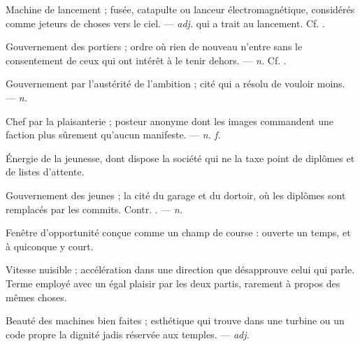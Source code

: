  Machine de lancement ; fusée, catapulte ou lanceur électromagnétique, considérés comme jeteurs de choses vers le ciel. ---  \textit{adj.} qui a trait au lancement. Cf. .

 Gouvernement des portiers ; ordre où rien de nouveau n'entre sans le consentement de ceux qui ont intérêt à le tenir dehors. ---  \textit{n.} Cf. .

 Gouvernement par l'austérité de l'ambition ; cité qui a résolu de vouloir moins. ---  \textit{n.}

 Chef par la plaisanterie ; posteur anonyme dont les images commandent une faction plus sûrement qu'aucun manifeste.   ---  \textit{n. f.}

 Énergie de la jeunesse, dont dispose la société qui ne la taxe point de diplômes et de listes d'attente. 

 Gouvernement des jeunes ; la cité du garage et du dortoir, où les diplômes sont remplacés par les commits. Contr. . ---  \textit{n.}

 Fenêtre d'opportunité conçue comme un champ de course : ouverte un temps, et à quiconque y court.  

 Vitesse nuisible ; accélération dans une direction que désapprouve celui qui parle. Terme employé avec un égal plaisir par les deux partis, rarement à propos des mêmes choses.

 Beauté des machines bien faites ; esthétique qui trouve dans une turbine ou un code propre la dignité jadis réservée aux temples. ---  \textit{adj.}

